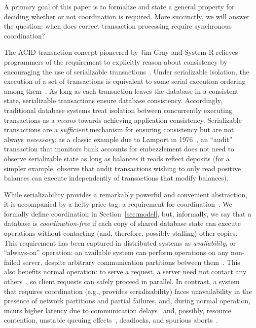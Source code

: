 A primary goal of this paper is to formalize and state
a general property for deciding whether or not coordination is
required. More succinctly, we will answer the question: when does
correct transaction processing require synchronous coordination?


 The ACID transaction concept
pioneered by Jim Gray and System R relieves programmers of the
requirement to explicitly reason about consistency by encouraging the
use of serializable transactions~\cite{gray-virtues}. Under
serializable isolation, the execution of a set of transactions is
equivalent to some serial execution ordering among
them~\cite{bernstein-book}. As long as each transaction leaves the
database in a consistent state, serializable transactions ensure
database consistency. Accordingly, traditional database systems treat
isolation between concurrently executing transactions as a
\textit{means} towards achieving application consistency. Serializable
transactions are a \textit{sufficient} mechanism for ensuring
consistency but are not always \textit{necessary}: as a classic
example due to Lamport in 1976~\cite{lamport-audit}, an ``audit''
transaction that monitors bank accounts for embezzlement does not need
to observe serializable state as long as balances it reads reflect
deposits (for a simpler example, observe that audit transactions
wishing to only read positive balances can execute independently of
transactions that modify balances).


 While serializability provides a
remarkably powerful and convenient abstraction, it is accompanied by a
hefty price tag: a requirement for
coordination~\cite{davidson-survey}. We formally define coordination
in Section~\ref{sec:model}, but, informally, we say that a database is
\textit{coordination-free} if each copy of shared database state can
execute operations without contacting (and, therefore, possibly
stalling) other copies. This requirement has been captured in
distributed systems as \textit{availability}, or ``always-on''
operation: an available system can perform operations on any
non-failed server, despite arbitrary communication partitions between
them~\cite{gilbert-cap}. This also benefits normal operation: to serve
a request, a \cfree server need not contact any others~\cite{pacelc},
so client requests can safely proceed in parallel. In contrast, a
system that requires coordination (e.g., provides serializability)
faces unavailability in the presence of network partitions and partial
failures, and, during normal operation, incurs higher latency due to
communication delays~\cite{hat-vldb} and, possibly, resource
contention, unstable queuing effects~\cite{ladis}, deadlocks, and
spurious aborts~\cite{bernstein-book,gray-virtues}.

